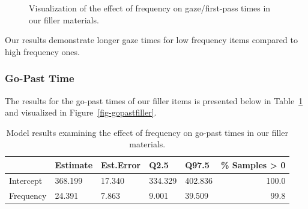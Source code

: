 \documentclass[
  letterpaper,
  DIV=11,
  numbers=noendperiod,
  nottoc]{scrreprt}
\begin{document}
\begin{figure}[htbp]


\caption{\label{fig-gazefiller}Visualization of the effect of frequency
on gaze/first-pass times in our filler materials.}

\end{figure}%

Our results demonstrate longer gaze times for low frequency items
compared to high frequency ones.

\subsubsection{Go-Past Time}\label{go-past-time-1}

The results for the go-past times of our filler items is presented below
in Table~\ref{tbl-gopastfiller} and visualized in
Figure~\ref{fig-gopastfiller}.

\begin{longtable}[]{@{}lllllr@{}}

\caption{\label{tbl-gopastfiller}Model results examining the effect of
frequency on go-past times in our filler materials.}

\tabularnewline

\toprule\noalign{}
& Estimate & Est.Error & Q2.5 & Q97.5 & \% Samples \textgreater{} 0 \\
\midrule\noalign{}
\endhead
\bottomrule\noalign{}
\endlastfoot
Intercept & 368.199 & 17.340 & 334.329 & 402.836 & 100.0 \\
Frequency & 24.391 & 7.863 & 9.001 & 39.509 & 99.8 \\

\end{longtable}
\end{document}
